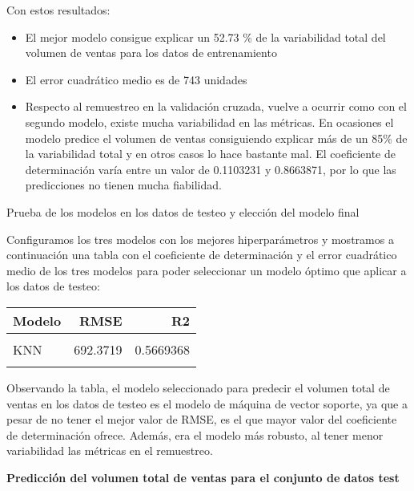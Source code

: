 \documentclass[
]{article}
\providecommand{\tightlist}{%
  \setlength{\itemsep}{0pt}\setlength{\parskip}{0pt}}
\begin{document}
Con estos resultados:

\begin{itemize}
\tightlist
\item
  El mejor modelo consigue explicar un 52.73 \% de la variabilidad total
  del volumen de ventas para los datos de entrenamiento
\item
  El error cuadrático medio es de 743 unidades
\item
  Respecto al remuestreo en la validación cruzada, vuelve a ocurrir como
  con el segundo modelo, existe mucha variabilidad en las métricas. En
  ocasiones el modelo predice el volumen de ventas consiguiendo explicar
  más de un 85\% de la variabilidad total y en otros casos lo hace
  bastante mal. El coeficiente de determinación varía entre un valor de
  0.1103231 y 0.8663871, por lo que las predicciones no tienen mucha
  fiabilidad.
\end{itemize}

Prueba de los modelos en los datos de testeo y elección del modelo final

Configuramos los tres modelos con los mejores hiperparámetros y
mostramos a continuación una tabla con el coeficiente de determinación y
el error cuadrático medio de los tres modelos para poder seleccionar un
modelo óptimo que aplicar a los datos de testeo:

\begin{table}[H]
\centering
\begin{tabular}{lrr}
\toprule
Modelo & RMSE & R2\\
\midrule
\cellcolor{gray!6}{SVM} & \cellcolor{gray!6}{660.7109} & \cellcolor{gray!6}{0.6006251}\\
KNN & 692.3719 & 0.5669368\\
\cellcolor{gray!6}{XGBoost} & \cellcolor{gray!6}{439.0573} & \cellcolor{gray!6}{0.5220638}\\
\bottomrule
\end{tabular}
\end{table}

Observando la tabla, el modelo seleccionado para predecir el volumen
total de ventas en los datos de testeo es el modelo de máquina de vector
soporte, ya que a pesar de no tener el mejor valor de RMSE, es el que
mayor valor del coeficiente de determinación ofrece. Además, era el
modelo más robusto, al tener menor variabilidad las métricas en el
remuestreo.

\textbf{Predicción del volumen total de ventas para el conjunto de datos
test}
\end{document}
